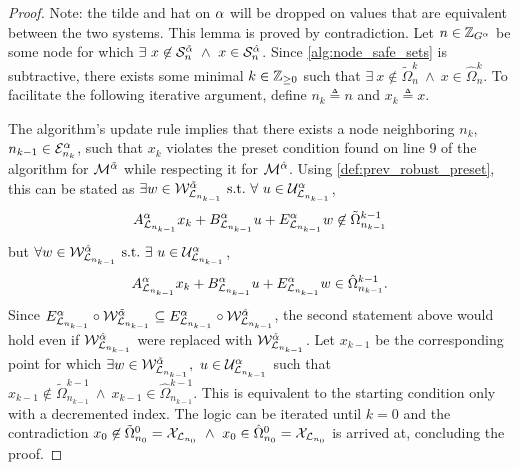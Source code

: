 \begin{proof}
Note: the tilde and hat on $\alpha$ will be dropped on values that are equivalent between the two systems. This lemma is proved by contradiction. Let $n\in\idxset{\gnumnodes[\agentidx]}$ be some node for which $\exists\ x\not\in\mathcal{S}_n^{\tilde{\agentidx}}\ \land\ x\in\mathcal{S}_n^{\hat{\agentidx}}$. Since \autoref{alg:node_safe_sets} is subtractive, there exists some minimal $k\in\mathbb{Z}_{\geq 0}$ such that $\exists\ x\not\in\tilde\Omega^k_{n}\ \land\ x\in\hat\Omega^k_{n}$. To facilitate the following iterative argument, define $n_k\triangleq n$ and $x_k\triangleq x$.

The algorithm's update rule implies that there exists a node neighboring $n_k$, $n_{k-1}\in\gnodeedges[\agentidx]{n_k}$, such that $x_k$ violates the preset condition found on line 9 of the algorithm for  $\mathcal{M}^{\tilde{\alpha}}$ while respecting it for  $\mathcal{M}^{\hat{\alpha}}$.  Using \autoref{def:prev_robust_preset}, this can be stated as $\exists w\in\wcon[{\gnodelabel{n_{k-1}}}]^{\tilde{\agentidx}}\ \st\ \forall\ u\in\ucon[{\gnodelabel{n_{k-1}}}]^\agentidx$,
\begin{align*}
A_{\mathcal{L}_{n_{k-1}}}^{\alpha} x_k+B_{\mathcal{L}_{n_{k-1}}}^{\alpha} u + E_{\mathcal{L}_{n_{k-1}}}^{\alpha} w \not\in \tilde\Omega^{k-1}_{{{n_{k-1}}}}
\end{align*}
but $\forall w\in\wcon[{\gnodelabel{n_{k-1}}}]^{\hat{\agentidx}}\ \st\ \exists\ u\in\ucon[{\gnodelabel{n_{k-1}}}]^\agentidx$,
\begin{align*}
A_{\mathcal{L}_{n_{k-1}}}^{\alpha} x_k+B_{\mathcal{L}_{n_{k-1}}}^{\alpha} u + E_{\mathcal{L}_{n_{k-1}}}^{\alpha} w \in \hat\Omega^{k-1}_{{{n_{k-1}}}}.
\end{align*}
Since $E_{\mathcal{L}_{n_{k-1}}}^{\alpha}\circ\mathcal{W}^{\tilde{\alpha}}_{\mathcal{L}_{n_{k-1}}}\subseteq E_{\mathcal{L}_{n_{k-1}}}^{\alpha}\circ\mathcal{W}^{\hat{\alpha}}_{\mathcal{L}_{n_{k-1}}}$, the second statement above would hold even if $\wcon[{\gnodelabel{n_{k-1}}}]^{\hat{\agentidx}}$ were replaced with $\wcon[{\gnodelabel{n_{k-1}}}]^{\tilde{\agentidx}}$. Let $x_{k-1}$ be the corresponding point for which $\exists w\in\wcon[{\gnodelabel{n_{k-1}}}]^{\tilde{\agentidx}},\ u\in\ucon[{\gnodelabel{n_{k-1}}}]^\agentidx$ such that $x_{k-1}\not\in\tilde\Omega^{k-1}_{n_{k-1}}\ \land\ x_{k-1}\in\hat\Omega^{k-1}_{n_{k-1}}$. This is equivalent to the starting condition only with a decremented index. The logic can be iterated until $k=0$ and the contradiction $x_0\not\in\tilde\Omega^{0}_{n_0}=\xcon[\gnodelabel{n_0}]\ \land\ x_0\in\hat\Omega^{0}_{n_0}=\xcon[\gnodelabel{n_0}]$ is arrived at, concluding the proof. 
\end{proof}
